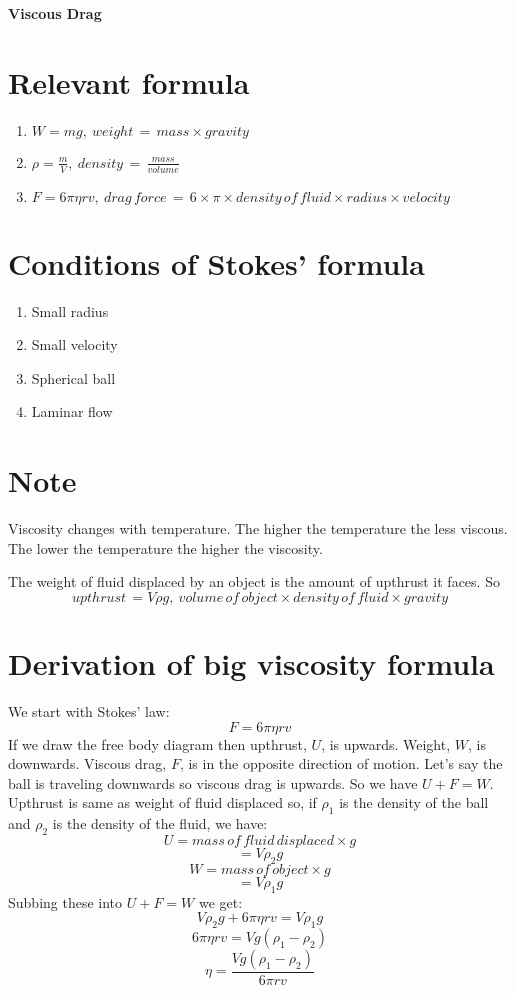 \documentclass[12pt]{article}
\begin{document}
    {\Huge \textbf{Viscous Drag} \par}

    \section*{Relevant formula}
    \begin{enumerate}
        \item $W = mg, \: weight \, = \, mass \times gravity$
        \item $\rho = \frac{m}{V}, \: density \, = \, \frac{mass}{volume}$
        \item $F = 6 \pi \eta rv, \: drag \, force \, = \, 6 \times \pi \times density \, 
        of \, fluid \times radius \times velocity$ 
    \end{enumerate}

    \section*{Conditions of Stokes' formula}
    \begin{enumerate}
        \item Small radius
        \item Small velocity
        \item Spherical ball
        \item Laminar flow
    \end{enumerate}

    \section*{Note}
    Viscosity changes with temperature. The higher the temperature the less viscous. The
    lower the temperature the higher the viscosity.

    The weight of fluid displaced by an object is the amount of upthrust it faces. So
    \[upthrust \, =  V\rho g, \: volume \, of \, object \times density \, of \, fluid \times gravity\]

    \section*{Derivation of big viscosity formula}
    We start with Stokes' law:
    \[F = 6\pi\eta rv\]
    If we draw the free body diagram then upthrust, $U$, is upwards. Weight, $W$, is downwards. Viscous 
    drag, $F$, is in the opposite direction of motion. Let's say the ball is traveling downwards so viscous
    drag is upwards. So we have $U + F = W$. Upthrust is same as weight of fluid displaced so, if $\rho_{1}$
    is the density of the ball and $\rho_{2}$ is the density of the fluid, we have:
    \[U = mass \, of \, fluid \, displaced \times g\]
    \[= V\rho_{2}g\] 
    \[W = mass \, of \, object \times g\]
    \[= V\rho_{1}g\]
    Subbing these into $U + F = W$ we get:
    \[V\rho_{2}g + 6\pi\eta rv = V\rho_{1}g\]
    \[6\pi\eta rv = Vg(\rho_{1} - \rho_{2})\]
    \[\eta = \frac{Vg(\rho_{1} - \rho_{2})}{6\pi rv}\]
\end{document}
